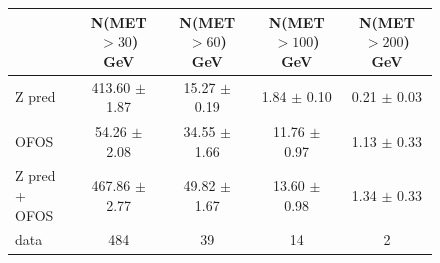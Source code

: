 \begin{figure}[hbtp]
  \begin{center}

	\medskip 

    \begin{tabular}{lcccc}
\hline
                        &   N(MET $>30$)  GeV    &   N(MET $>60$)  GeV    &   N(MET $>100$) GeV    &   N(MET $>200$) GeV \\
\hline
              Z pred    & 413.60  $\pm$  1.87    &  15.27  $\pm$  0.19    &    1.84 $\pm$  0.10    &   0.21  $\pm$  0.03 \\
                OFOS    &  54.26  $\pm$  2.08    &  34.55  $\pm$  1.66    &   11.76 $\pm$  0.97    &   1.13  $\pm$  0.33 \\
\hline
       Z pred + OFOS    & 467.86  $\pm$  2.77    &  49.82  $\pm$  1.67    &   13.60 $\pm$  0.98    &   1.34  $\pm$  0.33 \\
\hline
                   data &   484                  &    39                  &    14                  &     2 \\


\hline
    \end{tabular}


\end{center}
\end{figure}
